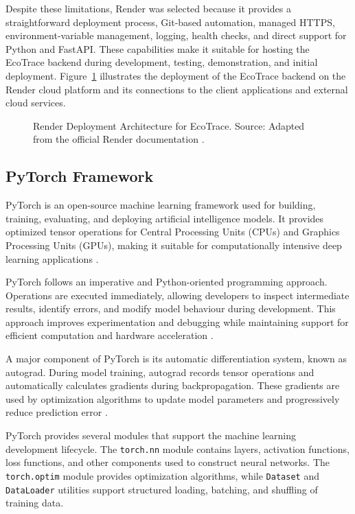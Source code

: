Despite these limitations, Render was selected because it provides a
straightforward deployment process, Git-based automation, managed HTTPS,
environment-variable management, logging, health checks, and direct support for
Python and FastAPI. These capabilities make it suitable for hosting the EcoTrace
backend during development, testing, demonstration, and initial deployment.
Figure~\ref{fig:render-arch} illustrates the deployment of the EcoTrace backend on
the Render cloud platform and its connections to the client applications and
external cloud services.

\begin{figure}[H]
  \centering
  \caption{Render Deployment Architecture for EcoTrace. Source: Adapted from the official Render documentation \citep{render2026fastapi,render2026webservices}.}
  \label{fig:render-arch}
\end{figure}

\subsection{PyTorch Framework}

PyTorch is an open-source machine learning framework used for building,
training, evaluating, and deploying artificial intelligence models. It provides
optimized tensor operations for Central Processing Units (CPUs) and Graphics
Processing Units (GPUs), making it suitable for computationally intensive deep
learning applications \citep{paszke2019,pytorch2026docs}.

PyTorch follows an imperative and Python-oriented programming approach.
Operations are executed immediately, allowing developers to inspect intermediate
results, identify errors, and modify model behaviour during development. This
approach improves experimentation and debugging while maintaining support for
efficient computation and hardware acceleration \citep{paszke2019}.

A major component of PyTorch is its automatic differentiation system, known
as autograd. During model training, autograd records tensor operations and
automatically calculates gradients during backpropagation. These gradients are
used by optimization algorithms to update model parameters and progressively
reduce prediction error \citep{pytorch2026autograd}.

PyTorch provides several modules that support the machine learning
development lifecycle. The \texttt{torch.nn} module contains layers, activation
functions, loss functions, and other components used to construct neural
networks. The \texttt{torch.optim} module provides optimization algorithms,
while \texttt{Dataset} and \texttt{DataLoader} utilities support structured loading,
batching, and shuffling of training data.

